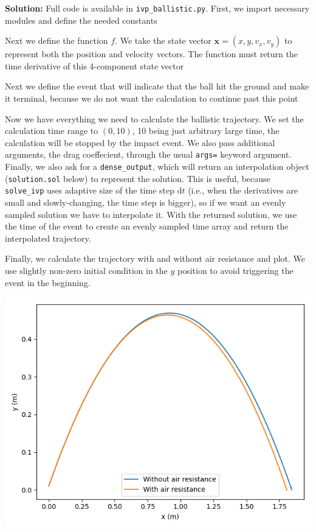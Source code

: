 \documentclass{article}
\newcommand{\dd}{\ensuremath{\mathrm{d}}}
\newcommand{\bv}[1]{\ensuremath{\mathbf{#1}}}
\newcommand{\ls}[1]{\lstinline{#1}}
\begin{document}
\textbf{Solution:}
Full code is available in \ls{ivp_ballistic.py}. First, we import necessary modules and define the needed constants


Next we define the function $f$. We take the state vector $\bv x = (x, y, v_x, v_y)$ to represent both the position and velocity vectors. The function must return the time derivative of this 4-component state vector


Next we define the event that will indicate that the ball hit the ground and make it terminal, because we do not want the calculation to continue past this point


Now we have everything we need to calculate the ballistic trajectory. We set the calculation time range to $(0, 10)$, 10 being just arbitrary large time, the calculation will be stopped by the impact event. We also pass additional arguments, the drag coeffecient, through the usual \ls{args=} keyword argument. Finally, we also ask for a \ls{dense_output}, which will return an interpolation object (\ls{solution.sol} below) to represent the solution. This is useful, because \ls{solve_ivp} uses adaptive size of the time step $\dd t$ (i.e., when the derivatives are small and slowly-changing, the time step is bigger), so if we want an evenly sampled solution we have to interpolate it. With the returned solution, we use the time of the event to create an evenly sampled time array and return the interpolated trajectory.

Finally, we calculate the trajectory with and without air resistance and plot. We use slightly non-zero initial condition in the $y$ position to avoid triggering the event in the beginning.


% 
\begin{center}
    \includegraphics[width=0.6\linewidth]{ballistic.png}
\end{center}
\end{document}
